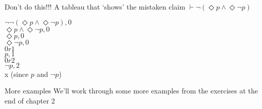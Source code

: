 \documentclass[
  14pt,
  letterpaper,
  ignorenonframetext,
  aspectratio=169,
]{beamer}
\begin{document}
\begin{frame}{Don't do this!!!}
\protect\hypertarget{dont-do-this}{}
A tableau that `shows' the mistaken claim
\(\vdash \neg(\Diamond p \wedge \Diamond \neg p)\)

\begin{center}
$\neg \neg(\Diamond p \wedge \Diamond \neg p), 0$ \\
$\Diamond p \wedge \Diamond \neg p, 0$ \\
$\Diamond p, 0$ \\
$\Diamond \neg p, 0$ \\
$0r1$ \\
$p, 1$ \\
$0r2$ \\
$\neg p, 2$ \\
x (since $p$ and $\neg p$)
\end{center}
\end{frame}

\begin{frame}{More examples}
\protect\hypertarget{more-examples}{}
We'll work through some more examples from the exercises at the end of
chapter 2
\end{frame}
\end{document}
